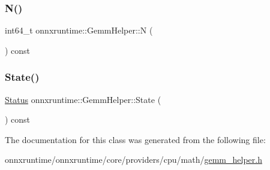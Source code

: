 \mbox{\label{classonnxruntime_1_1GemmHelper_ae66f09f6fd7e69f65381fd4e2a11270e}} 
\subsubsection{\texorpdfstring{N()}{N()}}
{\footnotesize\ttfamily int64\+\_\+t onnxruntime\+::\+Gemm\+Helper\+::N (\begin{DoxyParamCaption}{ }\end{DoxyParamCaption}) const\hspace{0.3cm}{\ttfamily [inline]}}

\mbox{\label{classonnxruntime_1_1GemmHelper_a08b89ea29f2cc3e3e1eea15c5f14df1c}} 
\subsubsection{\texorpdfstring{State()}{State()}}
{\footnotesize\ttfamily \mbox{\hyperlink{classonnxruntime_1_1common_1_1Status}{Status}} onnxruntime\+::\+Gemm\+Helper\+::\+State (\begin{DoxyParamCaption}{ }\end{DoxyParamCaption}) const\hspace{0.3cm}{\ttfamily [inline]}}



The documentation for this class was generated from the following file\+:\begin{DoxyCompactItemize}
\item 
onnxruntime/onnxruntime/core/providers/cpu/math/\mbox{\hyperlink{gemm__helper_8h}{gemm\+\_\+helper.\+h}}\end{DoxyCompactItemize}
